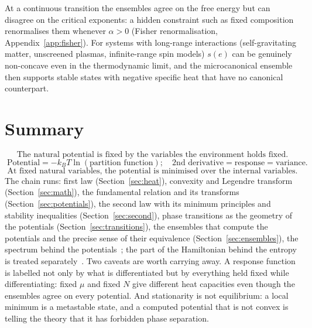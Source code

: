 \documentclass[10pt,a4paper]{article}
\theoremstyle{remark}
\begin{document}
At a continuous transition the ensembles agree on the free energy but can
disagree on the critical exponents: a hidden constraint such as fixed
composition renormalises them whenever $\alpha>0$ (Fisher renormalisation,
Appendix~\ref{app:fisher}). For systems with long-range interactions
(self-gravitating matter, unscreened plasmas, infinite-range spin models)
$s(e)$ can be genuinely non-concave even in the thermodynamic limit, and the
microcanonical ensemble then supports stable states with negative specific
heat that have no canonical counterpart.

\section{Summary}
\label{sec:summary}

\[
\;\text{The natural potential is fixed by the variables the environment
holds fixed.}\
\]
\[
\;\text{Potential}=-k_BT\ln(\text{partition function});\quad
\text{2nd derivative}=\text{response}=\text{variance.}\
\]
\[
\;\text{At fixed natural variables, the potential is minimised over the
internal variables.}\
\]
The chain runs: first law (Section~\ref{sec:heat}), convexity and Legendre
transform (Section~\ref{sec:math}), the fundamental relation and its
transforms (Section~\ref{sec:potentials}), the second law with its minimum
principles and stability inequalities (Section~\ref{sec:second}), phase
transitions as the geometry of the potentials (Section~\ref{sec:transitions}),
the ensembles that compute the potentials and the precise sense of their
equivalence (Section~\ref{sec:ensembles}), the spectrum behind the potentials~\cite{DOSNotes}; the part of the Hamiltonian behind the entropy is
treated separately~\cite{ThermalNotes}. Two caveats are worth carrying away. A
response function is labelled not only by what is differentiated but by
everything held fixed while differentiating: fixed $\mu$ and fixed $N$ give
different heat capacities even though the ensembles agree on every potential.
And stationarity is not equilibrium: a local minimum is a metastable state,
and a computed potential that is not convex is telling the theory that it has
forbidden phase separation.
\end{document}
